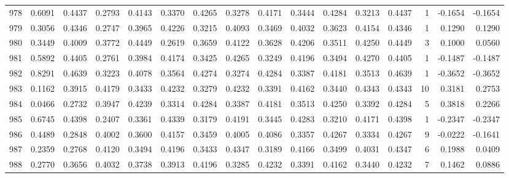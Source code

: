 \begin{tabular}{lrrrrrrrrrrrrrrr}
978 &      0.6091 &  0.4437 &  0.2793 &  0.4143 &  0.3370 &  0.4265 &  0.3278 &  0.4171 &  0.3444 &  0.4284 &   0.3213 &     0.4437 &      1 &                   -0.1654 &                    -0.1654 \\
979 &      0.3056 &  0.4346 &  0.2747 &  0.3965 &  0.4226 &  0.3215 &  0.4093 &  0.3469 &  0.4032 &  0.3623 &   0.4154 &     0.4346 &      1 &                    0.1290 &                     0.1290 \\
980 &      0.3449 &  0.4009 &  0.3772 &  0.4449 &  0.2619 &  0.3659 &  0.4122 &  0.3628 &  0.4206 &  0.3511 &   0.4250 &     0.4449 &      3 &                    0.1000 &                     0.0560 \\
981 &      0.5892 &  0.4405 &  0.2761 &  0.3984 &  0.4174 &  0.3425 &  0.4265 &  0.3249 &  0.4196 &  0.3494 &   0.4270 &     0.4405 &      1 &                   -0.1487 &                    -0.1487 \\
982 &      0.8291 &  0.4639 &  0.3223 &  0.4078 &  0.3564 &  0.4274 &  0.3274 &  0.4284 &  0.3387 &  0.4181 &   0.3513 &     0.4639 &      1 &                   -0.3652 &                    -0.3652 \\
983 &      0.1162 &  0.3915 &  0.4179 &  0.3433 &  0.4232 &  0.3279 &  0.4232 &  0.3391 &  0.4162 &  0.3440 &   0.4343 &     0.4343 &     10 &                    0.3181 &                     0.2753 \\
984 &      0.0466 &  0.2732 &  0.3947 &  0.4239 &  0.3314 &  0.4284 &  0.3387 &  0.4181 &  0.3513 &  0.4250 &   0.3392 &     0.4284 &      5 &                    0.3818 &                     0.2266 \\
985 &      0.6745 &  0.4398 &  0.2407 &  0.3361 &  0.4339 &  0.3179 &  0.4191 &  0.3445 &  0.4283 &  0.3210 &   0.4171 &     0.4398 &      1 &                   -0.2347 &                    -0.2347 \\
986 &      0.4489 &  0.2848 &  0.4002 &  0.3600 &  0.4157 &  0.3459 &  0.4005 &  0.4086 &  0.3357 &  0.4267 &   0.3334 &     0.4267 &      9 &                   -0.0222 &                    -0.1641 \\
987 &      0.2359 &  0.2768 &  0.4120 &  0.3494 &  0.4196 &  0.3433 &  0.4347 &  0.3189 &  0.4166 &  0.3499 &   0.4031 &     0.4347 &      6 &                    0.1988 &                     0.0409 \\
988 &      0.2770 &  0.3656 &  0.4032 &  0.3738 &  0.3913 &  0.4196 &  0.3285 &  0.4232 &  0.3391 &  0.4162 &   0.3440 &     0.4232 &      7 &                    0.1462 &                     0.0886 \\

\end{tabular}
